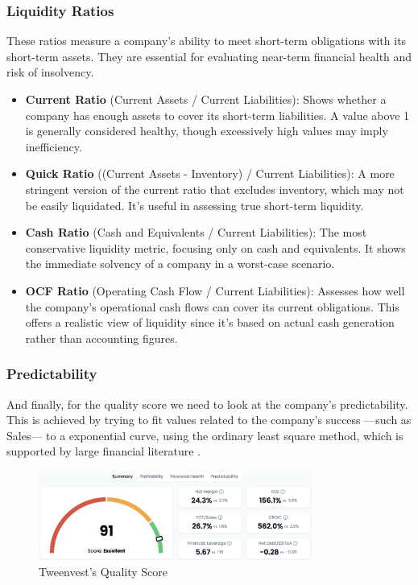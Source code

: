 \documentclass[11pt,english,a4paper,hidelinks]{book}
\begin{document}
\subsubsection{Liquidity Ratios}
These ratios measure a company's ability to meet short-term obligations with its short-term assets. They are essential for evaluating near-term financial health and risk of insolvency.

\begin{itemize}
    \item \textbf{Current Ratio} (Current Assets / Current Liabilities): Shows whether a company has enough assets to cover its short-term liabilities. A value above 1 is generally considered healthy, though excessively high values may imply inefficiency.
    
    \item \textbf{Quick Ratio} ((Current Assets - Inventory) / Current Liabilities): A more stringent version of the current ratio that excludes inventory, which may not be easily liquidated. It's useful in assessing true short-term liquidity.
    
    \item \textbf{Cash Ratio} (Cash and Equivalents / Current Liabilities): The most conservative liquidity metric, focusing only on cash and equivalents. It shows the immediate solvency of a company in a worst-case scenario.
    
    \item \textbf{OCF Ratio} (Operating Cash Flow / Current Liabilities): Assesses how well the company's operational cash flows can cover its current obligations. This offers a realistic view of liquidity since it's based on actual cash generation rather than accounting figures.
\end{itemize}

\subsubsection{Predictability}

\noindent And finally, for the quality score we need to look at the company's predictability. This is achieved by trying to fit values related to the company's success —such as Sales— to a exponential curve, using the ordinary least square method, which is supported by large financial literature \cite{msci2024fundamental}.


\begin{figure}[H]
    \centering
    \includegraphics[width=0.8\textwidth]{images/tweenvest/quality score.png}
    \caption{Tweenvest's Quality Score}
    \label{fig:quality_score}
\end{figure}
\end{document}
